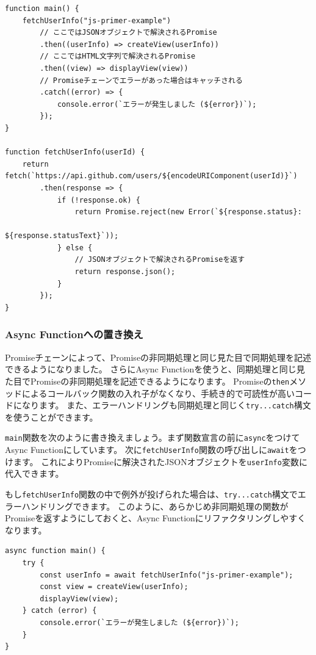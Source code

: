 \begin{lstlisting}
function main() {
    fetchUserInfo("js-primer-example")
        // ここではJSONオブジェクトで解決されるPromise
        .then((userInfo) => createView(userInfo))
        // ここではHTML文字列で解決されるPromise
        .then((view) => displayView(view))
        // Promiseチェーンでエラーがあった場合はキャッチされる
        .catch((error) => {
            console.error(`エラーが発生しました (${error})`);
        });
}

function fetchUserInfo(userId) {
    return fetch(`https://api.github.com/users/${encodeURIComponent(userId)}`)
        .then(response => {
            if (!response.ok) {
                return Promise.reject(new Error(`${response.status}: 
                                                 ${response.statusText}`));
            } else {
                // JSONオブジェクトで解決されるPromiseを返す
                return response.json();
            }
        });
}
\end{lstlisting}

\hypertarget{rewrite-to-async-function}{%
\subsubsection{Async
Functionへの置き換え}\label{rewrite-to-async-function}}

Promiseチェーンによって、Promiseの非同期処理と同じ見た目で同期処理を記述できるようになりました。
さらにAsync
Functionを使うと、同期処理と同じ見た目でPromiseの非同期処理を記述できるようになります。
Promiseの\texttt{then}メソッドによるコールバック関数の入れ子がなくなり、手続き的で可読性が高いコードになります。
また、エラーハンドリングも同期処理と同じく\texttt{try...catch}構文を使うことができます。

\texttt{main}関数を次のように書き換えましょう。まず関数宣言の前に\texttt{async}をつけてAsync
Functionにしています。
次に\texttt{fetchUserInfo}関数の呼び出しに\texttt{await}をつけます。
これによりPromiseに解決されたJSONオブジェクトを\texttt{userInfo}変数に代入できます。

もし\texttt{fetchUserInfo}関数の中で例外が投げられた場合は、\texttt{try...catch}構文でエラーハンドリングできます。
このように、あらかじめ非同期処理の関数がPromiseを返すようにしておくと、Async
Functionにリファクタリングしやすくなります。

\begin{lstlisting}
async function main() {
    try {
        const userInfo = await fetchUserInfo("js-primer-example");
        const view = createView(userInfo);
        displayView(view);
    } catch (error) {
        console.error(`エラーが発生しました (${error})`);
    }
}
\end{lstlisting}

